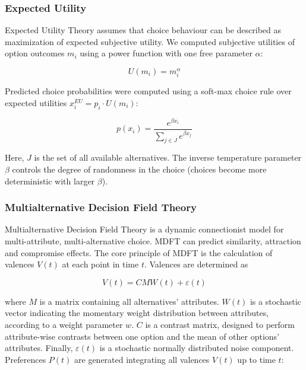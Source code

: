 \documentclass[11pt, a4paper]{article}
\begin{document}
\subsubsection*{Expected Utility}

Expected Utility Theory \parencite[EU;][]{vonneumann1947TheoryGamesEconomic} assumes that choice behaviour can be described as maximization of expected subjective utility. We computed subjective utilities of option outcomes $m_i$ using a power function with one free parameter $\alpha$:

\begin{equation}
    \label{eq:utility}
    U(m_i) = m_i^\alpha
\end{equation}

Predicted choice probabilities were computed using a soft-max choice rule \parencite{sutton2018ReinforcementLearningIntroduction} over expected utilities $x_i^{EU} = p_i \cdot U(m_i)$:

\begin{equation}
    \label{eq:softmax}
    p(x_i) = \frac{e^{\beta x_i}}{\sum_{j \in J}{e^{\beta x_j}}}
\end{equation}

Here, $J$ is the set of all available alternatives. The inverse temperature parameter $\beta$ controls the degree of randomness in the choice (choices become more deterministic with larger $\beta$).

\subsubsection*{Multialternative Decision Field Theory}

Multialternative Decision Field Theory \parencite[MDFT;][]{roe2001MultialternativeDecisionField} is a dynamic connectionist model for multi-attribute, multi-alternative choice. MDFT can predict similarity, attraction and compromise effects. The core principle of MDFT is the calculation of valences $V(t)$ at each point in time $t$. Valences are determined as

\begin{equation}
    \label{eq:mdft:v}
    V(t) = C M W(t) + \varepsilon(t)
\end{equation}

where $M$ is a matrix containing all alternatives' attributes. $W(t)$ is a stochastic vector indicating the momentary weight distribution between attributes, according to a weight parameter $w$. $C$ is a contrast matrix, designed to perform attribute-wise contrasts between one option and the mean of other options' attributes. Finally, $\varepsilon(t)$ is a stochastic normally distributed noise component. Preferences $P(t)$ are generated integrating all valences $V(t)$ up to time $t$:
\end{document}

